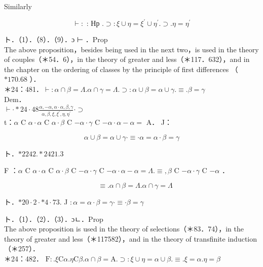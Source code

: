 \documentclass[10pt]{article}
\begin{document}
Similarly

$$
\vdash: \text { : Нр } . \supset: \xi \cup \eta=\xi^{\prime} \cup \eta^{\prime} . \supset . \eta=\eta^{\prime}
$$

ト．（1）．（8）．（9）．ɔ ⊢ ．Prop\\
The above proposition，besides being used in the next two，is used in the theory of couples（＊54．6），in the theory of greater and less（＊117．632），and in the chapter on the ordering of classes by the principle of first differences （ $* 170.68$ ）．\\
＊24：481．$\vdash: \alpha \cap \beta=\Lambda . \alpha \cap \gamma=\Lambda . \supset: \alpha \cup \beta=\alpha \cup \gamma . \equiv . \beta=\gamma$\\
Dem．\\
$\vdash \cdot * 24 \cdot 48 \frac{\alpha,-\alpha, \alpha \cdot \alpha, \beta, \gamma}{\alpha, \beta, \xi, \xi^{\prime}, \eta, \eta^{\prime}} \cdot \supset$\\
t：$\alpha$ C $\alpha \cdot \alpha$ C $\alpha \cdot \beta$ C $-\alpha \cdot \gamma$ C $-\alpha \cdot \alpha-\alpha=$ A． J：


\begin{equation*}
\alpha \cup \beta=\alpha \cup \gamma \cdot \equiv \cdot \alpha=\alpha \cdot \beta=\gamma \tag{1}
\end{equation*}


ト．$* 2242 . * 2421.3$

F ：$\alpha$ C $\alpha \cdot \alpha$ C $\alpha \cdot \beta$ C $-\alpha \cdot \gamma$ C $-\alpha \cdot \alpha-\alpha=\Lambda . \equiv, \beta$ C $-\alpha \cdot \gamma$ C $-\alpha$ ．


\begin{equation*}
[* 24311] \quad \equiv . \alpha \cap \beta=\Lambda . \alpha \cap \gamma=\Lambda \tag{2}
\end{equation*}


ト．$* 20 \cdot 2 \cdot * 4 \cdot 73$. J $: \alpha=\alpha \cdot \beta=\gamma \cdot \equiv \cdot \beta=\gamma$

ト．（1）．（2）．（3）．ɔㄴ．Prop\\
The above proposition is used in the theory of selections（＊83．74），in the theory of greater and less（＊117582），and in the theory of transfinite induction （＊257）．\\
＊24：482． $\mathrm{F}: . \xi \mathrm{C} \alpha . \eta \mathrm{C} \beta . \alpha \cap \beta=\mathrm{A} . \supset: \xi \cup \eta=\alpha \cup \beta . \equiv . \xi=\alpha . \eta=\beta$
\end{document}
